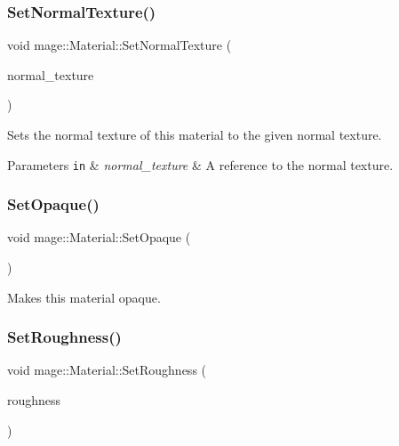 \subsubsection{\texorpdfstring{Set\+Normal\+Texture()}{SetNormalTexture()}}
{\footnotesize\ttfamily void mage\+::\+Material\+::\+Set\+Normal\+Texture (\begin{DoxyParamCaption}\item[{const \hyperlink{namespacemage_a1e01ae66713838a7a67d30e44c67703e}{Shared\+Ptr}$<$ const \hyperlink{classmage_1_1_texture}{Texture} $>$ \&}]{normal\+\_\+texture }\end{DoxyParamCaption})}

Sets the normal texture of this material to the given normal texture.


\begin{DoxyParams}[1]{Parameters}
\mbox{\tt in}  & {\em normal\+\_\+texture} & A reference to the normal texture. \\
\hline
\end{DoxyParams}
\hypertarget{classmage_1_1_material_ab3c49ab54603adebb1d08803fc700fc9}{}\label{classmage_1_1_material_ab3c49ab54603adebb1d08803fc700fc9} 
\subsubsection{\texorpdfstring{Set\+Opaque()}{SetOpaque()}}
{\footnotesize\ttfamily void mage\+::\+Material\+::\+Set\+Opaque (\begin{DoxyParamCaption}{ }\end{DoxyParamCaption})\hspace{0.3cm}{\ttfamily [noexcept]}}

Makes this material opaque. \hypertarget{classmage_1_1_material_ad1df4026da1b5abc3924c7ce09a81a02}{}\label{classmage_1_1_material_ad1df4026da1b5abc3924c7ce09a81a02} 
\subsubsection{\texorpdfstring{Set\+Roughness()}{SetRoughness()}}
{\footnotesize\ttfamily void mage\+::\+Material\+::\+Set\+Roughness (\begin{DoxyParamCaption}\item[{\hyperlink{namespacemage_aa97e833b45f06d60a0a9c4fc22ae02c0}{F32}}]{roughness }\end{DoxyParamCaption})\hspace{0.3cm}{\ttfamily [noexcept]}}

